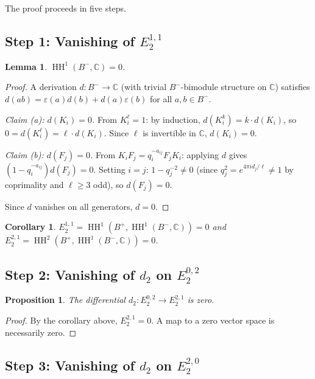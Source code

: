 \documentclass[11pt,letterpaper]{amsart}
\theoremstyle{plain}
\newtheorem{lemma}[theorem]{Lemma}
\newtheorem{corollary}[theorem]{Corollary}
\newtheorem{proposition}[theorem]{Proposition}
\theoremstyle{definition}
\theoremstyle{remark}
\newcommand{\HH}{\operatorname{HH}}
\newcommand{\CC}{\mathbb{C}}
\newcommand{\bplus}{B^{+}}
\newcommand{\bminus}{B^{-}}
\begin{document}
The proof proceeds in five steps.

\subsection{Step 1: Vanishing of $E_2^{1,1}$}

\begin{lemma}
\label{lem:hh1}
$\HH^1(\bminus, \CC) = 0$.
\end{lemma}

\begin{proof}
A derivation $d \colon \bminus \to \CC$ (with trivial $\bminus$-bimodule structure on $\CC$) satisfies $d(ab) = \varepsilon(a) d(b) + d(a) \varepsilon(b)$ for all $a, b \in \bminus$.

\emph{Claim (a): $d(K_i) = 0$.} From $K_i^\ell = 1$: by induction, $d(K_i^k) = k \cdot d(K_i)$, so $0 = d(K_i^\ell) = \ell \cdot d(K_i)$. Since $\ell$ is invertible in $\CC$, $d(K_i) = 0$.

\emph{Claim (b): $d(F_j) = 0$.} From $K_i F_j = q_i^{-a_{ij}} F_j K_i$: applying $d$ gives $(1 - q_i^{-a_{ij}}) d(F_j) = 0$. Setting $i = j$: $1 - q_j^{-2} \neq 0$ (since $q_j^2 = e^{4\pi i d_j/\ell} \neq 1$ by coprimality and $\ell \geq 3$ odd), so $d(F_j) = 0$.

Since $d$ vanishes on all generators, $d = 0$.
\end{proof}

\begin{corollary}
$E_2^{1,1} = \HH^1(\bplus, \HH^1(\bminus, \CC)) = 0$ and $E_2^{2,1} = \HH^2(\bplus, \HH^1(\bminus, \CC)) = 0$.
\end{corollary}

\subsection{Step 2: Vanishing of $d_2$ on $E_2^{0,2}$}

\begin{proposition}
The differential $d_2 \colon E_2^{0,2} \to E_2^{2,1}$ is zero.
\end{proposition}

\begin{proof}
By the corollary above, $E_2^{2,1} = 0$. A map to a zero vector space is necessarily zero.
\end{proof}

\subsection{Step 3: Vanishing of $d_2$ on $E_2^{2,0}$}
\end{document}

